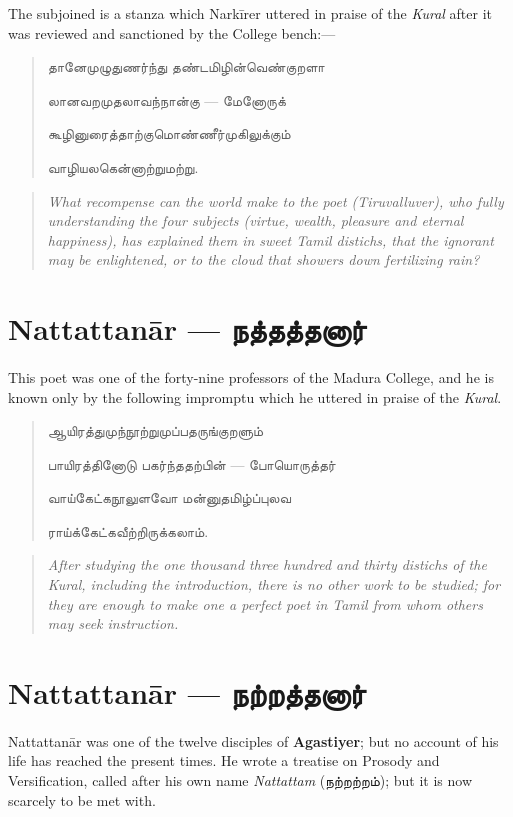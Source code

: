 \documentclass{article}
\newcommand{\TamilText}[1]{\texttamil{#1}}
\newcommand{\TamilBold}[1]{\texttamil{\textbf{#1}}}
\newcommand{\tam}[1]{\TamilText{#1}}
\newcommand{\tambold}[1]{\TamilBold{#1}}
\begin{document}
The subjoined is a stanza which Nark\={i}rer uttered in praise of the \emph{Kural} after it was reviewed and sanctioned by the College bench:---
\begin{quotation}\small
\tam{தானேமுழுதுணர்ந்து தண்டமிழின்வெண்குறளா}

\tam{லானவறமுதலாவந்நான்கு} --- \tam{மேனோருக்‌}

\tam{கூழினுரைத்தாற்குமொண்ணீர்முகிலுக்கும்‌}

\tam{வாழியலகென்னாற்றுமற்று}.
\end{quotation}
\begin{quotation}\small
\emph{What recompense can the world make to the poet (Tiruvalluver), who fully understanding the four subjects (virtue, wealth, pleasure and eternal happiness), has explained them in sweet Tamil distichs, that the ignorant may be enlightened, or to the cloud that showers down fertilizing rain?}
\end{quotation}

\section{Nattattan\={a}r --- \tambold{நத்தத்தனார்}}
\paragraph{}
This poet was one of the forty-nine professors of the Madura College, and he is known only by the following impromptu which he uttered in praise of the \emph{Kural}.
\begin{quotation}\small
\tam{ஆயிரத்துமுந்நூற்றுமுப்பதருங்குறளும்‌}

\tam{பாயிரத்தினோடு பகர்ந்ததற்பின்‌} --- \tam{போயொருத்தர்}

\tam{வாய்கேட்கநூலுளவோ மன்னுதமிழ்ப்புலவ}

\tam{ராய்க்கேட்கவீற்றிருக்கலாம்‌}.
\end{quotation}
\begin{quotation}\small
\emph{After studying the one thousand three hundred and thirty distichs of the Kural, including the introduction, there is no other work to be studied; for they are enough to make one a perfect poet in Tamil from whom others may seek instruction.}
\end{quotation}

\section{Nattattan\={a}r --- \tambold{நற்றத்தனார்}}
\paragraph{}
Nattattan\={a}r was one of the twelve disciples of \textbf{Agastiyer}; but no account of his life has reached the present times. He wrote a treatise on Prosody and Versification, called after his own name \emph{Nattattam} (\tam{நற்றற்றம்}); but it is now scarcely to be met with.
\end{document}

